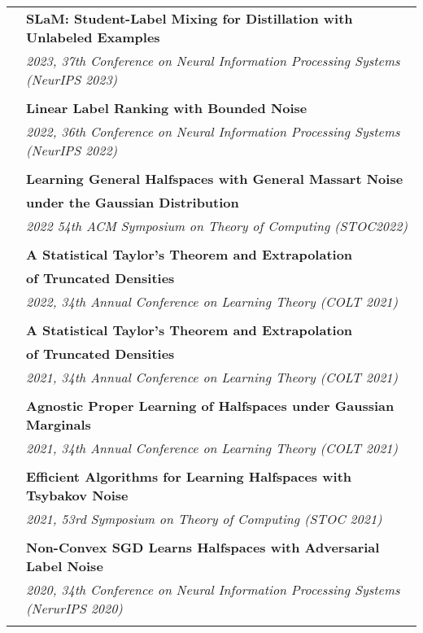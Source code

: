 \documentclass[letterpaper,11pt,oneside]{article}
\begin{document}
\begin{longtable}{@{} l l}
 &\textbf{SLaM: Student-Label Mixing for Distillation with Unlabeled Examples} \\
 &\emph{2023, 37th Conference on Neural Information Processing Systems (NeurIPS 2023)} \\
 & \\

 &\textbf{Linear Label Ranking with Bounded Noise}\\ 
& \emph{2022, 36th Conference on Neural Information Processing Systems (NeurIPS 2022)} \\
 & \\

 &\textbf{Learning General Halfspaces with General Massart Noise}\\
 & \textbf{under the Gaussian Distribution}\\
 & \emph{2022 54th ACM Symposium on Theory of Computing (STOC2022)}\\
 & \\

 &\textbf{A Statistical Taylor's Theorem and Extrapolation}\\
 & \textbf{of Truncated Densities}\\
 & \emph{2022, 34th Annual Conference on Learning Theory (COLT 2021)} \\
 & \\

 &\textbf{A Statistical Taylor's Theorem and Extrapolation}\\
 & \textbf{of Truncated Densities}\\
 & \emph{2021, 34th Annual Conference on Learning Theory (COLT 2021)} \\
 & \\

 &\textbf{Agnostic Proper Learning of Halfspaces under Gaussian Marginals}\\
 & \emph{2021, 34th Annual Conference on Learning Theory (COLT 2021)} \\
 & \\

 &\textbf{Efficient Algorithms for Learning Halfspaces with Tsybakov Noise} \\
 & \emph{2021, 53rd Symposium on Theory of Computing (STOC 2021)} \\
 & \\

     &\textbf{Non-Convex SGD Learns Halfspaces with Adversarial Label Noise} \\
     & \emph{2020, 34th Conference on Neural Information Processing Systems (NerurIPS 2020)} \\
     & \\


\end{longtable}
\end{document}
